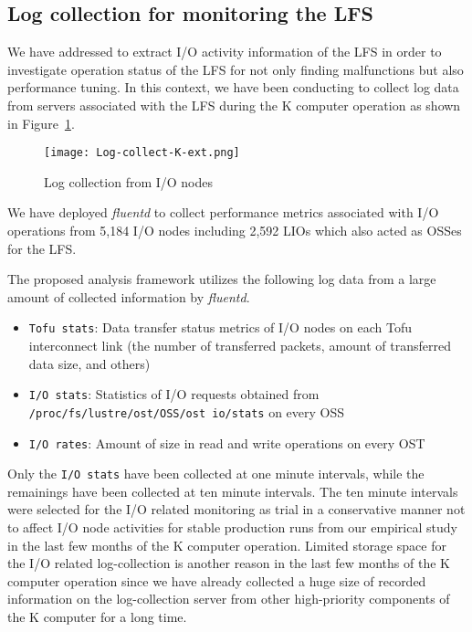 \documentclass{jhps}
\begin{document}
\subsection{Log collection for monitoring the LFS}
\label{ssec:LOG_COLL_MON}

We have addressed to extract I/O activity information of the LFS
in order to investigate operation status of the LFS
for not only finding malfunctions but also performance tuning.
In this context, we have been conducting to collect log data from servers
associated with the LFS during the K computer operation
as shown in Figure~\ref{fig:Log-collect-K}.
%
\begin{figure}[tb]
\centering
\texttt{[image: Log-collect-K-ext.png]}
\caption{Log collection from I/O nodes}
\label{fig:Log-collect-K}
\end{figure}
We have deployed {\itshape fluentd} to collect performance metrics associated with
I/O operations from 5,184 I/O nodes including 2,592 LIOs which also acted as OSSes
for the LFS.


The proposed analysis framework utilizes the following log data from a large amount of collected information by {\itshape fluentd}.
%
\begin{itemize}
\item {\tt Tofu stats}: Data transfer status metrics of I/O nodes on each Tofu interconnect link
(the number of transferred packets, amount of transferred data size, and others)
\item {\tt I/O stats}: Statistics of I/O requests obtained from
{\tt /proc/fs/lustre/ost/OSS/ost io/stats} on every OSS
\item {\tt I/O rates}: Amount of size in read and write operations on every OST
\end{itemize}
%
Only the {\tt I/O stats} have been collected at one minute intervals,
while the remainings have been collected at ten minute intervals.
The ten minute intervals were selected for the I/O related monitoring as trial
in a conservative manner not to affect I/O node activities for stable production runs
from our empirical study in the last few months of the K computer operation.
Limited storage space for the I/O related log-collection is another reason
in the last few months of the K computer operation since we have already collected
a huge size of recorded information on the log-collection server
from other high-priority components of the K computer for a long time.
\end{document}
